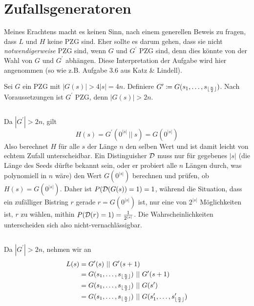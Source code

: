 \documentclass{../crypto}
\date{27. November 2015}
\begin{document}
\maketitle

\section{Zufallsgeneratoren}

Meines Erachtens macht es keinen Sinn, nach einem generellen Beweis zu fragen,
dass $L$ und $H$ keine PZG sind. Eher sollte es darum gehen, dass sie nicht
\emph{notwendigerweise} PZG sind, wenn $G$ und $G^\prime$ PZG sind, denn dies
könnte von der Wahl von $G$ und $G^\prime$ abhängen. Diese
Interpretation der Aufgabe wird hier angenommen (so wie z.B. Aufgabe 3.6 aus
Katz \& Lindell).

Sei $G$ ein PZG mit $|G(s)| > 4|s| = 4n$. Definiere $G^\prime \coloneqq
G(s_1,\ldots,s_{\lfloor \frac{n}{2} \rfloor})$.  Nach Voraussetzungen ist
$G^\prime$ PZG, denn $|G(s)| > 2n$. 

\subsection{}

Da $|G^\prime| > 2n$, gilt 
\begin{equation*}
   H(s) = G^\prime(0^{|s|} ~||~ s) = G(0^{|s|})
\end{equation*}
Also berechnet $H$ für alle $s$ der Länge $n$ den selben Wert und ist damit leicht von echtem
Zufall unterscheidbar. Ein Distinguisher $\mathcal{D}$ muss nur für gegebenes $|s|$
(die Länge des Seeds dürfte bekannt sein, oder er probiert alle $n$ Längen
durch, was polynomiell in $n$ wäre)
den Wert $G(0^{|s|})$ berechnen und prüfen, ob $H(s) = G(0^{|s|})$. Daher ist
$P(\mathcal{D}(G(s)) = 1) = 1$, während die Situation, dass ein zufälliger
Bistring $r$ gerade $r=G(0^{|s|})$ ist, nur eine von $2^{|s|}$ Möglichkeiten
ist, $r$ zu wählen, mithin $P(\mathcal{D}(r) = 1) = \frac{1}{2^{|s|}}$. Die
Wahrscheinlichkeiten unterscheiden sich also nicht-vernachlässigbar.

\subsection{}

Da $|G^\prime| > 2n$, nehmen wir an 
\begin{align*}
   L(s) & = G^\prime(s) ~||~ G^\prime(s+1)  \\
        & = G(s_1,\ldots,s_{\lfloor\frac{n}{2}\rfloor}) ~||~ G^\prime(s+1) \\
        & = G(s_1,\ldots,s_{\lfloor\frac{n}{2}\rfloor}) ~||~ G(s^\prime) \\
        & = G(s_1,\ldots,s_{\lfloor\frac{n}{2}\rfloor}) ~||~ G(s^\prime_1,\ldots,s^\prime_{\lfloor\frac{n}{2}\rfloor}) \\
\end{align*}
\end{document}

